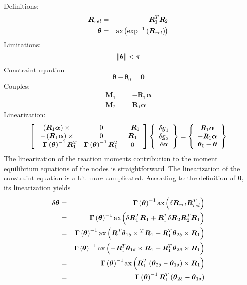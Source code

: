 \documentclass[10pt,dvips]{report}
\newcommand{\T}[1]{\boldsymbol{#1}}
\begin{document}
\noindent
Definitions:
\begin{eqnarray*}
	\T{R}_{rel} & = & \T{R}_1^T \T{R}_2 \\
	\T{\theta} & = & \llk{ax}\plbr{\llk{exp}^{-1}\plbr{\T{R}_{rel}}}
\end{eqnarray*}
Limitations:
\begin{displaymath}
	\nrbr{\T{\theta}} < \pi
\end{displaymath}
Constraint equation 
\begin{displaymath}
	\T{\theta} - \T{\theta}_0 = \T{0}
\end{displaymath}
Couples:
\begin{eqnarray*}
	\T{M}_1 & = & -\T{R}_1 \T{\alpha} \\
	\T{M}_2 & = & \T{R}_1 \T{\alpha}
\end{eqnarray*}
Linearization:
\begin{displaymath}
	\sqbr{\matr{ccc}{
		\plbr{\T{R}_1 \T{\alpha}}\times{} & 0 & -\T{R}_1 \\
		-\plbr{\T{R}_1 \T{\alpha}}\times{} & 0 & \T{R}_1 \\
		-\T{\Gamma}\plbr{\T{\theta}}^{-1} \T{R}_1^T &
			\T{\Gamma}\plbr{\T{\theta}}^{-1} \T{R}_1^T & 0
	}}\cubr{\cvvect{
		\delta\T{g}_1 \\
		\delta\T{g}_2 \\
		\delta\T{\alpha} \\
	}} = \cubr{\cvvect{
		\T{R}_1 \T{\alpha} \\
		-\T{R}_1 \T{\alpha} \\
		\T{\theta}_0 - \T{\theta}
	}}
\end{displaymath}
The linearization of the reaction moments contribution 
to the moment equilibrium equations of the nodes is straightforward.
The linearization of the constraint equation is a bit more complicated.
According to the definition of $\T{\theta}$, its linearization
yields
\begin{eqnarray*}
	\delta\T{\theta}
		& = & \T{\Gamma}\plbr{\T{\theta}}^{-1} 
			\llk{ax}\plbr{\delta\T{R}_{rel} \T{R}_{rel}^T} \\
		& = & \T{\Gamma}\plbr{\T{\theta}}^{-1} \llk{ax}\plbr{
			\delta\T{R}_1^T \T{R}_1
			+ \T{R}_1^T \delta\T{R}_2 \T{R}_2^T \T{R}_1
		} \\
		& = & \T{\Gamma}\plbr{\T{\theta}}^{-1} \llk{ax}\plbr{
			\T{R}_1^T \T{\theta}_{1\delta}\times{}^T \T{R}_1
			+ \T{R}_1^T \T{\theta}_{2\delta}\times{} \T{R}_1
		} \\
		& = & \T{\Gamma}\plbr{\T{\theta}}^{-1} \llk{ax}\plbr{
			- \T{R}_1^T \T{\theta}_{1\delta}\times{} \T{R}_1
			+ \T{R}_1^T \T{\theta}_{2\delta}\times{} \T{R}_1
		} \\
		& = & \T{\Gamma}\plbr{\T{\theta}}^{-1}
			\llk{ax} \plbr{
				\T{R}_1^T \plbr{
					\T{\theta}_{2\delta}
					- \T{\theta}_{1\delta}
				}\times \T{R}_1
			} \\
		& = & \T{\Gamma}\plbr{\T{\theta}}^{-1} \T{R}_1^T \plbr{
			\T{\theta}_{2\delta} - \T{\theta}_{1\delta}
		}
\end{eqnarray*}
\end{document}
